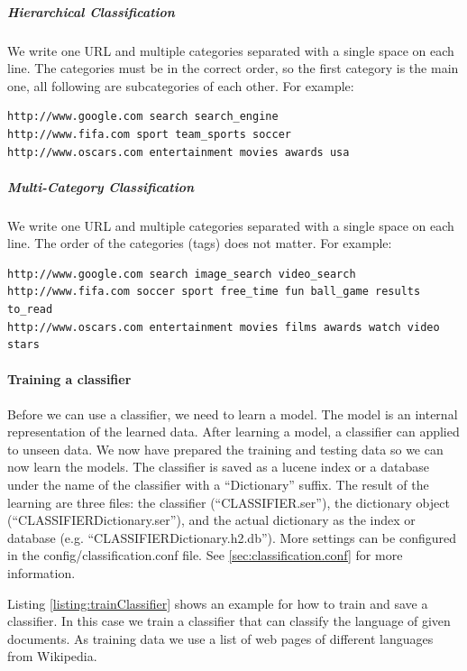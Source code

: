 \documentclass[a4paper,twoside]{book}      %
\begin{document}
\subparagraph{Hierarchical Classification}
We write one URL and multiple categories separated with a single space on each line. The categories must be in the correct order, so the first category is the main one, all following are subcategories of each other. For example:
\begin{verbatim}
http://www.google.com search search_engine
http://www.fifa.com sport team_sports soccer 
http://www.oscars.com entertainment movies awards usa
\end{verbatim}

\subparagraph{Multi-Category Classification}
We write one URL and multiple categories separated with a single space on each line. The order of the categories (tags) does not matter. For example:
\begin{verbatim}
http://www.google.com search image_search video_search
http://www.fifa.com soccer sport free_time fun ball_game results to_read
http://www.oscars.com entertainment movies films awards watch video stars
\end{verbatim}

\paragraph{Training a classifier}
Before we can use a classifier, we need to learn a model. The model is an internal representation of the learned data. After learning a model, a classifier can applied to unseen data. We now have prepared the training and testing data so we can now learn the models.
The classifier is saved as a lucene index or a database under the name of the classifier with a ``Dictionary'' suffix. The result of the learning are three files: the classifier (``CLASSIFIER.ser''), the dictionary object (``CLASSIFIERDictionary.ser''), and the actual dictionary as the index or database (e.g. ``CLASSIFIERDictionary.h2.db''). More settings can be configured in the config/classification.conf file. See \ref{sec:classification.conf} for more information.

Listing \ref{listing:trainClassifier} shows an example for how to train and save a classifier. In this case we train a classifier that can classify the language of given documents. As training data we use a list of web pages of different languages from Wikipedia.
\end{document}
